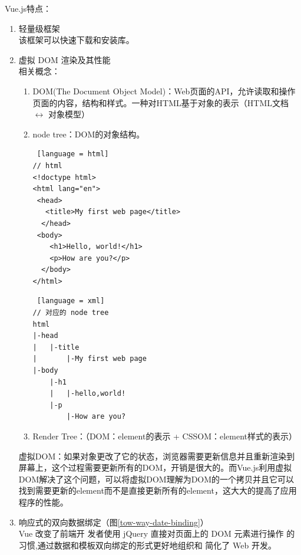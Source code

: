 Vue.js特点：
\begin{enumerate}
  \item 轻量级框架\\该框架可以快速下载和安装库。
  \item 虚拟 DOM 渲染及其性能\\
        相关概念：
        \begin{enumerate}
          \item DOM(The Document Object Model)：Web页面的API，允许读取和操作页面的内容，结构和样式。一种对HTML基于对象的表示（HTML文档 $\leftrightarrow$ 对象模型）
          \item node tree：DOM的对象结构。
                \begin{lstlisting} [language = html]
// html
<!doctype html>
<html lang="en">
 <head>
   <title>My first web page</title>
  </head>
 <body>
    <h1>Hello, world!</h1>
    <p>How are you?</p>
  </body>
</html>
          \end{lstlisting}
                \begin{lstlisting} [language = xml]
// 对应的 node tree
html
|-head
|   |-title
|       |-My first web page
|-body
    |-h1
    |   |-hello,world!
    |-p
        |-How are you?
\end{lstlisting}
          \item Render Tree：（DOM：element的表示 + CSSOM：element样式的表示）
        \end{enumerate}
        虚拟DOM：如果对象更改了它的状态，浏览器需要更新信息并且重新渲染到屏幕上，这个过程需要更新所有的DOM，开销是很大的。而Vue.js利用虚拟DOM解决了这个问题，可以将虚拟DOM理解为DOM的一个拷贝并且它可以找到需要更新的element而不是直接更新所有的element，这大大的提高了应用程序的性能。
  \item 响应式的双向数据绑定（图\ref{tow-way-date-binding}）\\
  Vue 改变了前端开 发者使用 jQuery 直接对页面上的 DOM 元素进行操作 的习惯,通过数据和模板双向绑定的形式更好地组织和 简化了 Web 开发。\cite{.2020g}


\end{enumerate}
